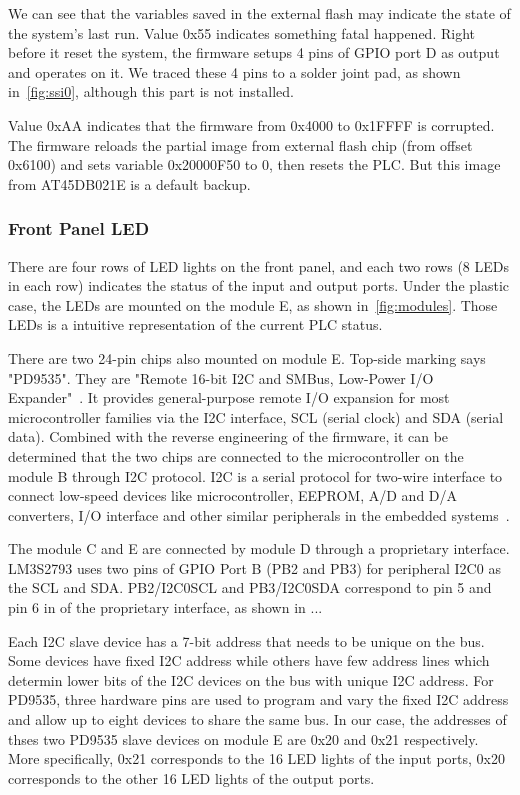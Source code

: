 We can see that the variables saved in the external flash may indicate the state of the system's last run. Value 0x55 indicates something fatal happened. Right before it reset the system, the firmware setups 4 pins of GPIO port D as output and operates on it. We traced these 4 pins to a solder joint pad, as shown in~\autoref{fig:ssi0}, although this part is not installed.

Value 0xAA indicates that the firmware from 0x4000 to 0x1FFFF is corrupted. The firmware reloads the partial image from external flash chip (from offset 0x6100) and sets variable 0x20000F50 to 0, then resets the PLC. But this image from AT45DB021E is a default backup.


\subsubsection{Front Panel LED}

There are four rows of LED lights on the front panel, and each two rows (8 LEDs in each row) indicates the status of the input and output ports. Under the plastic case, the LEDs are mounted on the module E, as shown in~\autoref{fig:modules}. Those LEDs is a intuitive representation of the current PLC status.

There are two 24-pin chips also mounted on module E. Top-side marking says "PD9535". They are "Remote 16-bit I2C and SMBus, Low-Power I/O Expander"~\cite{pd9535}. It provides general-purpose remote I/O expansion for most microcontroller families via the I2C interface, SCL (serial clock) and SDA (serial data). Combined with the reverse engineering of the firmware, it can be determined that the two chips are connected to the microcontroller on the module B through I2C protocol. I2C is a serial protocol for two-wire interface to connect low-speed devices like microcontroller, EEPROM, A/D and D/A converters, I/O interface and other similar peripherals in the embedded systems~\cite{semiconductors2000i2c}.

The module C and E are connected by module D through a proprietary interface. LM3S2793 uses two pins of GPIO Port B (PB2 and PB3) for peripheral I2C0 as the SCL and SDA. PB2/I2C0SCL and PB3/I2C0SDA correspond to pin 5 and pin 6 in of the  proprietary interface, as shown in ...

Each I2C slave device has a 7-bit address that needs to be unique on the bus. Some devices have fixed I2C address while others have few address lines which determin lower bits of the I2C devices on the bus with unique I2C address. For PD9535, three hardware pins are used to program and vary the fixed I2C address and allow up to eight devices to share the same bus. In our case, the addresses of thses two PD9535 slave devices on module E are 0x20 and 0x21 respectively. More specifically, 0x21 corresponds to the 16 LED lights of the input ports, 0x20 corresponds to the other 16 LED lights of the output ports. 

